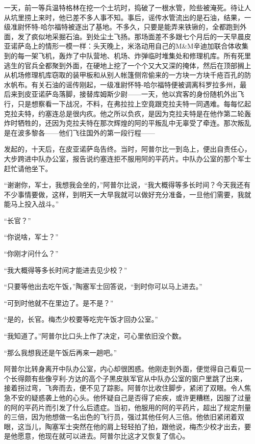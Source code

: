  


    一天，前一等兵温特格林在挖一个土坑时，捣破了一根水管，险些被淹死。待让人从坑里捞上来时，他已差不多人事不知。事后，谣传水管流出的是石油，结果，一级准尉怀特-哈尔福特被逐出了基地。不多久，只要是能弄来铁锹的，全都跑到外面，发了疯似地采掘石油。到处尘土飞扬。那场面差不多跟七个月后的一天早晨皮亚诺萨岛上的情形一模一样：头天晚上，米洛动用自己的M&M辛迪加联合体收集到的每一架飞机，轰炸了中队营地、机场、炸弹临时堆集处和修理机库。所有死里逃生的官兵全都聚到外面，在硬地上挖了一个个又大又深的掩体，然后在顶部搁上从机场修理机库窃取的装甲板和从别人帐篷侧帘偷来的一方块一方块千疮百孔的防水帆布。有关石油的谣传刚起，一级准尉怀特-哈尔福特便被调离科罗拉多州，最后来到皮亚诺萨岛落脚，接替库姆斯少尉——一天，他以宾客的身份随机外出飞行，只是想察看一下战况，不料，在弗拉拉上空竟跟克拉夫特一同遇难。每每忆起克拉夫特，约塞连总是很内疚。他之所以负疚，是因为克拉夫特是在他作第二轮轰炸时牺牲的，还因为克拉夫特在那次辉煌的阿的平叛乱中无辜受了牵连。那次叛乱是在波多黎各——他们飞往国外的第一段行程——

    发起的，十天后，在皮亚诺萨岛告终。当时，阿普尔比一到岛上，便出自责任心，大步跨进中队办公室，报告说约塞连拒不服用阿的平药片。中队办公室的那个军士赶忙请他坐下。

    “谢谢你，军士，我想我会坐的，”阿普尔比说，“我大概得等多长时间？今天我还有不少事情要做，这样，到明天一大早我就可以做好充分准备，一旦他们需要，我就能马上投入战斗。”

    “长官？”

    “你说啥，军士？”

    “你刚才问什么？”

    “我大概得等多长时间才能进去见少校？”

    “只要等他出去吃午饭，”陶塞军士回答说，“到时你可以马上进去。”

    “可到时他就不在里边了。是不是？”

    “是的，长官。梅杰少校要等吃完午饭才回办公室。”

    “我知道了。”阿普尔比口头上作了决定，可心里依旧没个数。

    “那么我想我还是午饭后再来一趟吧。”

    阿普尔比转身离开中队办公室，内心却很困惑。他刚走到外面，便觉得自己看见一个长得颇有些像亨利-方达的高个子黑皮肤军官从中队办公室的窗户里跳了出来，接着拐过弯，飞奔而去，便不见了踪影。阿普尔比收住脚步，紧闭了双眼。令人焦急不安的疑惑袭上他的心头。他怀疑自己是否得了疟疾，或许更糟糕，因服了过量的阿的平药片而引发了什么后遗症。当初，他服用的阿的平药片，超出了规定剂量的三倍，因为他想做一名出色的飞行员，强过其他任何人三倍。他依旧紧闭着双眼，这当儿，陶塞军士突然在他的肩上轻轻拍了拍，跟他说，梅杰少校才出去，要是他愿意，他现在就可以进去。阿普尔比这才又恢复了信心。

